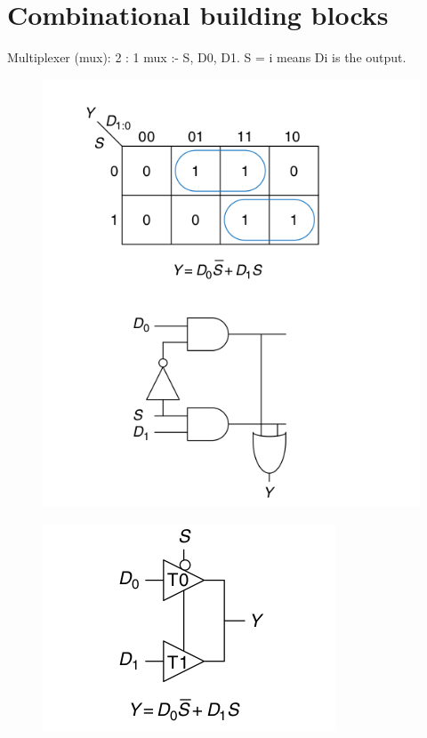 \documentclass{article}[12pt]
\begin{document}
\section{Combinational building blocks}
Multiplexer (mux): 
2 : 1 mux :- S, D0, D1. S = i means Di is the output. 
\begin{figure}[htbp]
\centerline{\includegraphics[scale = 0.3]{../Images/mux-21-logic.png}}
\end{figure}
\begin{figure}[htbp]
\centerline{\includegraphics[scale = 0.3]{../Images/mux-21-buff.png}}
\end{figure}
\end{document}
